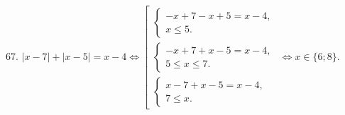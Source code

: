 67. $|x-7|+|x-5|=x-4\Leftrightarrow \left[\begin{array}{l}\begin{cases} -x+7-x+5=x-4,\\ x\leqslant 5.\end{cases}\\
\begin{cases} -x+7+x-5=x-4,\\ 5\leqslant x\leqslant 7 .\end{cases}\\\begin{cases} x-7+x-5=x-4,\\ 7\leqslant x.\end{cases}\end{array}\right.\Leftrightarrow
x\in\{6;8\}.$\\
